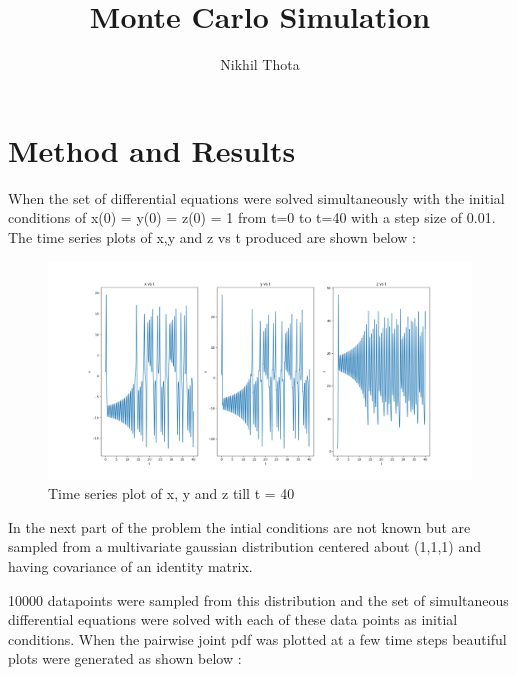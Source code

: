 \documentclass{article}
\title{\vspace{-1.8cm}\textbf{Monte Carlo Simulation}}
\author{Nikhil Thota}
\date{}
\begin{document}
\maketitle

\section{Method and Results}

When the set of differential equations were solved simultaneously with the initial conditions of x(0) = y(0) = z(0) = 1 from t=0 to t=40 with a step size of 0.01. The time series plots of x,y and z vs t produced are shown below :

\vspace{-0.6cm}

\begin{figure}[h]
    \centering
    \includegraphics[width=0.5\paperwidth]{x_y_z_t.png}
    \caption{Time series plot of x, y and z till t = 40}
    \label{fig:time series plot of x,y and z}
\end{figure}

\vspace{-0.5cm}

In the next part of the problem the intial conditions are not known but are sampled from a multivariate gaussian distribution centered about (1,1,1) and having covariance of an identity matrix. 

10000 datapoints were sampled from this distribution and the set of simultaneous differential equations were solved with each of these data points as initial conditions. When the pairwise joint pdf was plotted at a few time steps beautiful plots were generated as shown below :

\vspace{-0.5cm}
\end{document}
